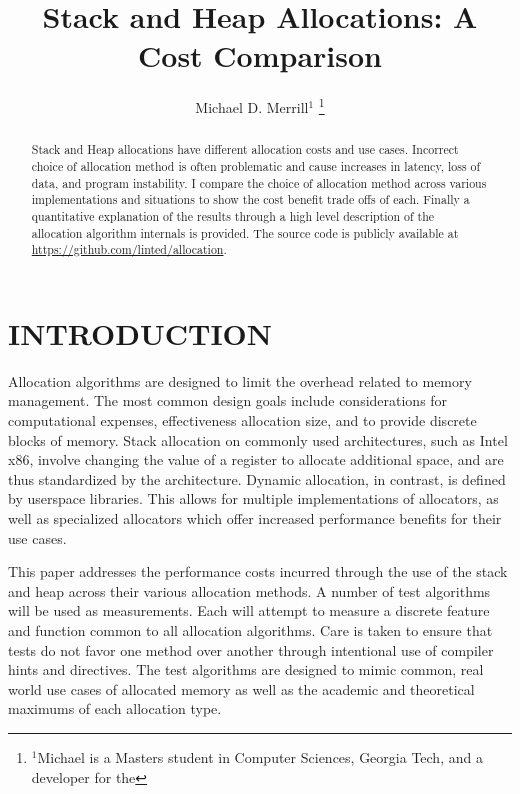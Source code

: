 \documentclass[letterpaper, 10 pt, conference]{ieeeconf}  %
\title{\LARGE \bf
Stack and Heap Allocations: A Cost Comparison
}
\author{Michael D. Merrill$^{1}$%
\thanks{$^{1}$Michael is a Masters student in Computer Sciences, Georgia Tech,
and a developer for the }%
}
\newcommand*\GitHubLoc{https://github.com/linted/allocation}
\begin{document}
\maketitle
\thispagestyle{empty}
\pagestyle{empty}


\begin{abstract}
Stack and Heap allocations have different allocation costs and use cases.
Incorrect choice of allocation method is often problematic and cause increases in latency,
loss of data, and program instability. I compare the choice of allocation method across various 
implementations and situations to show the cost benefit trade offs of each. 
Finally a quantitative explanation of the results through a high level description of the allocation algorithm internals is provided.
The source code is publicly available at \url{\GitHubLoc}.

\end{abstract}

\section{INTRODUCTION}

Allocation algorithms are designed to limit the overhead related to memory management.
The most common design goals include considerations for computational expenses, effectiveness allocation size, and to provide discrete blocks of memory. 
Stack allocation on commonly used architectures, such as Intel x86, involve changing the value of a register to allocate additional space, and are thus standardized by the architecture.
Dynamic allocation, in contrast, is defined by userspace libraries.
This allows for multiple implementations of allocators, as well as specialized allocators which offer increased performance benefits for their use cases. 

This paper addresses the performance costs incurred through the use of the stack and heap across their various allocation methods. 
A number of test algorithms will be used as measurements. 
Each will attempt to measure a discrete feature and function common to all allocation algorithms. 
Care is taken to ensure that tests do not favor one method over another through intentional use of compiler hints and directives. 
The test algorithms are designed to mimic common, real world use cases of allocated memory as well as the academic and theoretical maximums of each allocation type. 
\end{document}

